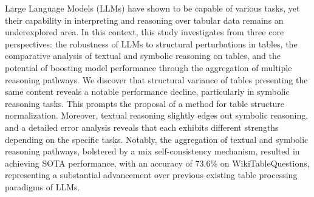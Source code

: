 Large Language Models (LLMs) have shown to be capable of various tasks, yet their capability in interpreting and reasoning over tabular data remains an underexplored area. In this context, this study investigates from three core perspectives: the robustness of LLMs to structural perturbations in tables, the comparative analysis of textual and symbolic reasoning on tables, and the potential of boosting model performance through the aggregation of multiple reasoning pathways. We discover that structural variance of tables presenting the same content reveals a notable performance decline, particularly in symbolic reasoning tasks. This prompts the proposal of a method for table structure normalization. Moreover, textual reasoning slightly edges out symbolic reasoning, and a detailed error analysis reveals that each exhibits different strengths depending on the specific tasks. Notably, the aggregation of textual and symbolic reasoning pathways, bolstered by a mix self-consistency mechanism, resulted in achieving SOTA performance, with an accuracy of 73.6\% on WikiTableQuestions, representing a substantial advancement over previous existing table processing paradigms of LLMs.